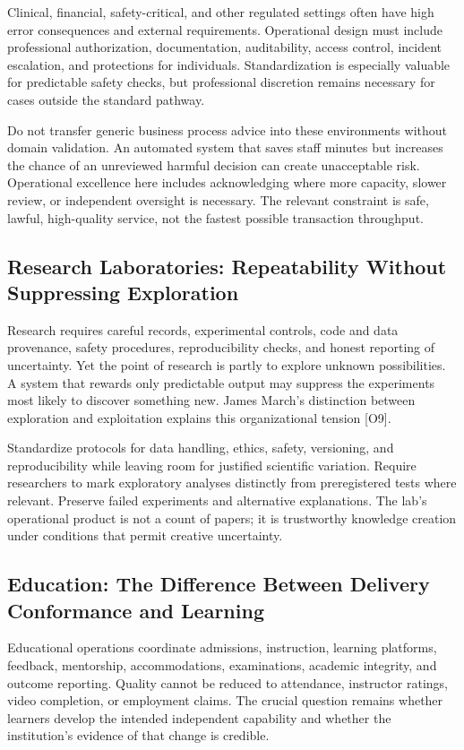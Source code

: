 Clinical, financial, safety-critical, and other regulated settings often have high error consequences and external requirements. Operational design must include professional authorization, documentation, auditability, access control, incident escalation, and protections for individuals. Standardization is especially valuable for predictable safety checks, but professional discretion remains necessary for cases outside the standard pathway.

Do not transfer generic business process advice into these environments without domain validation. An automated system that saves staff minutes but increases the chance of an unreviewed harmful decision can create unacceptable risk. Operational excellence here includes acknowledging where more capacity, slower review, or independent oversight is necessary. The relevant constraint is safe, lawful, high-quality service, not the fastest possible transaction throughput.

\subsection{Research Laboratories: Repeatability Without Suppressing Exploration}
\label{sec:arch_research}

Research requires careful records, experimental controls, code and data provenance, safety procedures, reproducibility checks, and honest reporting of uncertainty. Yet the point of research is partly to explore unknown possibilities. A system that rewards only predictable output may suppress the experiments most likely to discover something new. James March's distinction between exploration and exploitation explains this organizational tension [O9].

Standardize protocols for data handling, ethics, safety, versioning, and reproducibility while leaving room for justified scientific variation. Require researchers to mark exploratory analyses distinctly from preregistered tests where relevant. Preserve failed experiments and alternative explanations. The lab's operational product is not a count of papers; it is trustworthy knowledge creation under conditions that permit creative uncertainty.

\subsection{Education: The Difference Between Delivery Conformance and Learning}
\label{sec:arch_education}

Educational operations coordinate admissions, instruction, learning platforms, feedback, mentorship, accommodations, examinations, academic integrity, and outcome reporting. Quality cannot be reduced to attendance, instructor ratings, video completion, or employment claims. The crucial question remains whether learners develop the intended independent capability and whether the institution's evidence of that change is credible.


